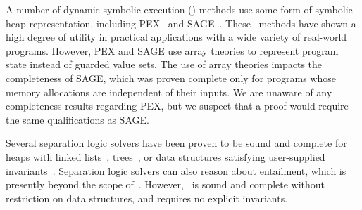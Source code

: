 
A number of dynamic symbolic execution (\dsetxt{}) methods use some form 
of symbolic heap representation, including PEX~\cite{Tillmann:2008} and SAGE~\cite{Elkarablieh:2009}. These~\dsetxt{} methods have shown a high degree of utility in practical applications with a wide variety of real-world programs. However, PEX and SAGE use array theories to represent program state instead of guarded value sets. The use of array theories impacts the completeness of SAGE, which was proven complete only for programs whose memory allocations are independent of their inputs. We are unaware of any completeness results regarding PEX, but we suspect that a proof would require the same qualifications as SAGE. 

Several separation logic solvers have been proven to be sound and complete for heaps with linked lists~\cite{Navarro:2011,Cook:2011,Berdine:2005}, trees~\cite{Piskac:2014}, or data structures satisfying user-supplied invariants~\cite{Brotherston:2014}. Separation logic solvers can also reason about entailment, which is presently beyond the scope of~\symtxt{}. However,~\symtxt{} is sound and complete without restriction on data structures, and requires no explicit invariants.







%
%
%

%
%
%
%
%
